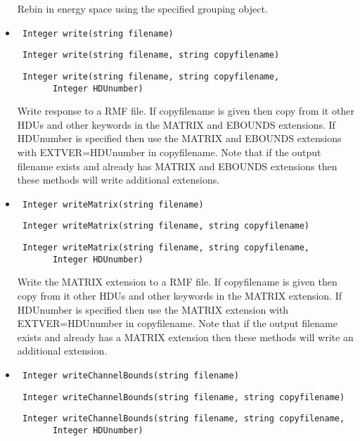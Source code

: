 \documentclass[11pt]{book}
\begin{document}
\begin{itemize}
          Rebin in energy space using the specified grouping object.

\item  \begin{verbatim} Integer write(string filename) \end{verbatim}
       \begin{verbatim} Integer write(string filename, string copyfilename) \end{verbatim}
       \begin{verbatim} Integer write(string filename, string copyfilename,
       Integer HDUnumber) \end{verbatim}

          Write response to a RMF file. If copyfilename is given then
          copy from it other HDUs and other keywords in the MATRIX and
          EBOUNDS extensions. If HDUnumber is specified then use the
          MATRIX and EBOUNDS extensions with EXTVER=HDUnumber in
          copyfilename. Note that if the output filename exists and 
          already has MATRIX and EBOUNDS extensions then these methods 
          will write additional extensions.

\item  \begin{verbatim} Integer writeMatrix(string filename) \end{verbatim}
       \begin{verbatim} Integer writeMatrix(string filename, string copyfilename) \end{verbatim}
       \begin{verbatim} Integer writeMatrix(string filename, string copyfilename,
       Integer HDUnumber) \end{verbatim}

          Write the MATRIX extension to a RMF file. If copyfilename is 
          given then copy from it other HDUs and other keywords in the 
          MATRIX extension. If HDUnumber is specified then use the
          MATRIX extension with EXTVER=HDUnumber in copyfilename. Note 
          that if the output filename exists and already has a MATRIX 
          extension then these methods will write an additional extension.

\item  \begin{verbatim} Integer writeChannelBounds(string filename) \end{verbatim}
       \begin{verbatim} Integer writeChannelBounds(string filename, string copyfilename) \end{verbatim}
       \begin{verbatim} Integer writeChannelBounds(string filename, string copyfilename,
       Integer HDUnumber) \end{verbatim}


\end{itemize}
\end{document}
